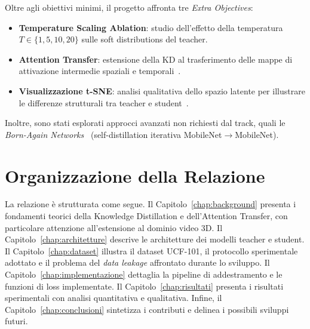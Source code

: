 Oltre agli obiettivi minimi, il progetto affronta tre \textit{Extra Objectives}:

\begin{itemize}
    \item \textbf{Temperature Scaling Ablation}: studio dell'effetto della temperatura $T \in \{1, 5, 10, 20\}$ sulle soft distributions del teacher.
    \item \textbf{Attention Transfer}: estensione della KD al trasferimento delle mappe di attivazione intermedie spaziali e temporali~\cite{zagoruyko2017paying}.
    \item \textbf{Visualizzazione t-SNE}: analisi qualitativa dello spazio latente per illustrare le differenze strutturali tra teacher e student~\cite{vandermaaten2008tsne}.
\end{itemize}

Inoltre, sono stati esplorati approcci avanzati non richiesti dal track, quali le \textit{Born-Again Networks}~\cite{furlanello2018born} (self-distillation iterativa MobileNet$\rightarrow$MobileNet).

\section{Organizzazione della Relazione}

La relazione è strutturata come segue. Il Capitolo~\ref{chap:background} presenta i fondamenti teorici della Knowledge Distillation e dell'Attention Transfer, con particolare attenzione all'estensione al dominio video 3D. Il Capitolo~\ref{chap:architetture} descrive le architetture dei modelli teacher e student. Il Capitolo~\ref{chap:dataset} illustra il dataset UCF-101, il protocollo sperimentale adottato e il problema del \textit{data leakage} affrontato durante lo sviluppo. Il Capitolo~\ref{chap:implementazione} dettaglia la pipeline di addestramento e le funzioni di loss implementate. Il Capitolo~\ref{chap:risultati} presenta i risultati sperimentali con analisi quantitativa e qualitativa. Infine, il Capitolo~\ref{chap:conclusioni} sintetizza i contributi e delinea i possibili sviluppi futuri.
